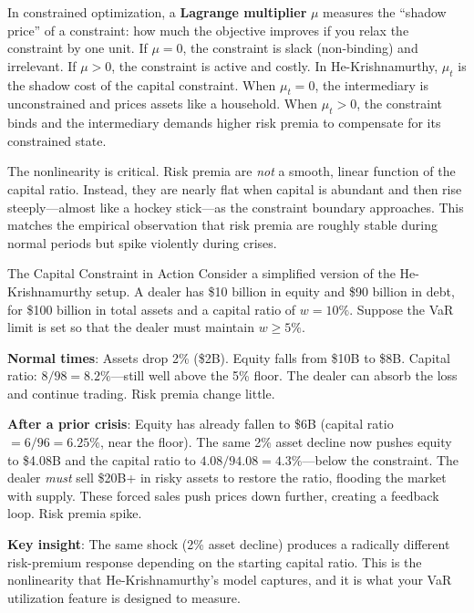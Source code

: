 \begin{prereq}
In constrained optimization, a \textbf{Lagrange multiplier} $\mu$ measures the ``shadow price'' of a constraint: how much the objective improves if you relax the constraint by one unit. If $\mu = 0$, the constraint is slack (non-binding) and irrelevant. If $\mu > 0$, the constraint is active and costly. In He-Krishnamurthy, $\mu_t$ is the shadow cost of the capital constraint. When $\mu_t = 0$, the intermediary is unconstrained and prices assets like a household. When $\mu_t > 0$, the constraint binds and the intermediary demands higher risk premia to compensate for its constrained state.
\end{prereq}

The nonlinearity is critical. Risk premia are \emph{not} a smooth, linear function of the capital ratio. Instead, they are nearly flat when capital is abundant and then rise steeply---almost like a hockey stick---as the constraint boundary approaches. This matches the empirical observation that risk premia are roughly stable during normal periods but spike violently during crises.

\begin{workedexample}{The Capital Constraint in Action}
Consider a simplified version of the He-Krishnamurthy setup. A dealer has \$10 billion in equity and \$90 billion in debt, for \$100 billion in total assets and a capital ratio of $w = 10\%$. Suppose the VaR limit is set so that the dealer must maintain $w \geq 5\%$.

\textbf{Normal times}: Assets drop 2\% (\$2B). Equity falls from \$10B to \$8B. Capital ratio: $8/98 = 8.2\%$---still well above the 5\% floor. The dealer can absorb the loss and continue trading. Risk premia change little.

\textbf{After a prior crisis}: Equity has already fallen to \$6B (capital ratio $= 6/96 = 6.25\%$, near the floor). The same 2\% asset decline now pushes equity to \$4.08B and the capital ratio to $4.08/94.08 = 4.3\%$---below the constraint. The dealer \emph{must} sell \$20B+ in risky assets to restore the ratio, flooding the market with supply. These forced sales push prices down further, creating a feedback loop. Risk premia spike.

\textbf{Key insight}: The same shock (2\% asset decline) produces a radically different risk-premium response depending on the starting capital ratio. This is the nonlinearity that He-Krishnamurthy's model captures, and it is what your VaR utilization feature is designed to measure.
\end{workedexample}


